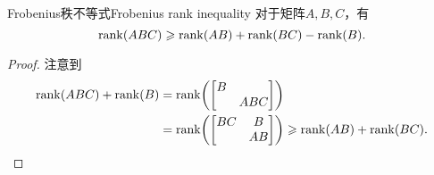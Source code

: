 \begin{theorem}{Frobenius秩不等式}{Frobenius rank inequality}
	对于矩阵$A,B,C$，有
	\begin{equation}
		\operatorname{rank}(ABC)\geqslant\operatorname{rank}(AB)+\operatorname{rank}(BC)-\operatorname{rank}(B).
	\end{equation}
\end{theorem}
\begin{proof}
	注意到
	\begin{align*}
		\operatorname{rank}(ABC)+\operatorname{rank}(B)&=\operatorname{rank}\biggl(\begin{bmatrix}
			B\\ &ABC
		\end{bmatrix}\biggr)\\
		&=\operatorname{rank}\biggl(\begin{bmatrix}
			BC&B\\ &AB
		\end{bmatrix}\biggr)\geqslant\operatorname{rank}(AB)+\operatorname{rank}(BC).\qedhere
	\end{align*}
\end{proof}

